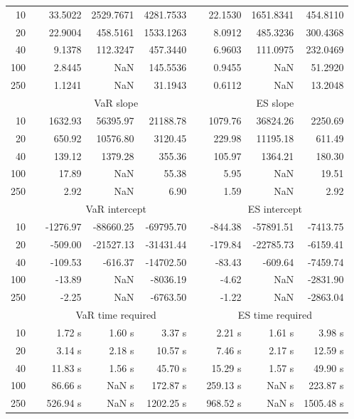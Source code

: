 {{\begin{longtable}{rr rrr r rrr}
10 &&  33.5022 & 2529.7671 & 4281.7533 & & 22.1530 & 1651.8341 & 454.8110 \\ 
20 &&  22.9004 & 458.5161 & 1533.1263 & & 8.0912 & 485.3236 & 300.4368 \\ 
40 &&  9.1378 & 112.3247 & 457.3440 & & 6.9603 & 111.0975 & 232.0469 \\ 
100 &&  2.8445 &    NaN & 145.5536 & & 0.9455 &    NaN & 51.2920 \\ 
250 &&  1.1241 &    NaN & 31.1943 & & 0.6112 &    NaN & 13.2048 \\ 
\hline 
 & & \multicolumn{3}{c}{ VaR slope} && \multicolumn{3}{c}{ES slope} \\ \cline{3-5}  \cline{7-9}
10 && 1632.93 & 56395.97 & 21188.78 && 1079.76 & 36824.26 & 2250.69 \\ 
20 && 650.92 & 10576.80 & 3120.45 && 229.98 & 11195.18 & 611.49 \\ 
40 && 139.12 & 1379.28 & 355.36 && 105.97 & 1364.21 & 180.30 \\ 
100 && 17.89 &  NaN & 55.38 && 5.95 &  NaN & 19.51 \\ 
250 && 2.92 &  NaN & 6.90 && 1.59 &  NaN & 2.92 \\ 
\hline 
 & & \multicolumn{3}{c}{ VaR intercept} &&  \multicolumn{3}{c}{ES intercept} \\ \cline{3-5}  \cline{7-9}
10 &&  -1276.97 & -88660.25 & -69795.70 && -844.38 & -57891.51 & -7413.75 \\ 
20 &&  -509.00 & -21527.13 & -31431.44 && -179.84 & -22785.73 & -6159.41 \\ 
40 &&  -109.53 & -616.37 & -14702.50 && -83.43 & -609.64 & -7459.74 \\ 
100 &&  -13.89 &  NaN & -8036.19 && -4.62 &  NaN & -2831.90 \\ 
250 &&  -2.25 &  NaN & -6763.50 && -1.22 &  NaN & -2863.04 \\ 
\hline 
 & & \multicolumn{3}{c}{VaR time required} && \multicolumn{3}{c}{ES time required} \\ \cline{3-5}  \cline{7-9}
10 & & 1.72 s & 1.60 s & 3.37 s && 2.21 s & 1.61 s & 3.98 s \\ 
20 & & 3.14 s & 2.18 s & 10.57 s && 7.46 s & 2.17 s & 12.59 s \\ 
40 & & 11.83 s & 1.56 s & 45.70 s && 15.29 s & 1.57 s & 49.90 s \\ 
100 & & 86.66 s &  NaN s & 172.87 s && 259.13 s &  NaN s & 223.87 s \\ 
250 & & 526.94 s &  NaN s & 1202.25 s && 968.52 s &  NaN s & 1505.48 s \\ 

\end{longtable}}}
